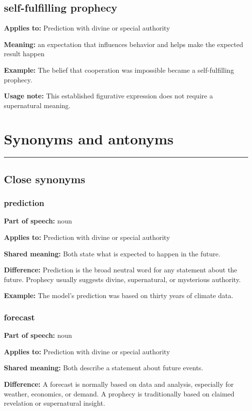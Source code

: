 \documentclass[11pt]{article}
\newcommand{\sectionrule}{\par\vspace{-0.5em}\noindent\textcolor{Accent}{\rule{\linewidth}{0.6pt}}\par}
\begin{document}
\subsection{self-fulfilling prophecy}
\textbf{Applies to:} Prediction with divine or special authority

\textbf{Meaning:} an expectation that influences behavior and helps make the expected result happen

\textbf{Example:} The belief that cooperation was impossible became a self-fulfilling prophecy.

\textbf{Usage note:} This established figurative expression does not require a supernatural meaning.

\section{Synonyms and antonyms}
\sectionrule
\subsection{Close synonyms}
\subsubsection{prediction}
\textbf{Part of speech:} noun

\textbf{Applies to:} Prediction with divine or special authority

\textbf{Shared meaning:} Both state what is expected to happen in the future.

\textbf{Difference:} Prediction is the broad neutral word for any statement about the future. Prophecy usually suggests divine, supernatural, or mysterious authority.

\textbf{Example:} The model's prediction was based on thirty years of climate data.

\subsubsection{forecast}
\textbf{Part of speech:} noun

\textbf{Applies to:} Prediction with divine or special authority

\textbf{Shared meaning:} Both describe a statement about future events.

\textbf{Difference:} A forecast is normally based on data and analysis, especially for weather, economics, or demand. A prophecy is traditionally based on claimed revelation or supernatural insight.
\end{document}
